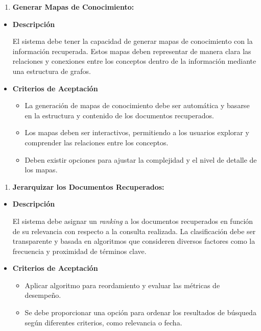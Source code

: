 \documentclass[
  12pt,
  openany]{book}
\providecommand{\tightlist}{%
  \setlength{\itemsep}{0pt}\setlength{\parskip}{0pt}}
\begin{document}
\begin{enumerate}
\def\labelenumi{\arabic{enumi}.}
\setcounter{enumi}{3}
\tightlist
\item
  \textbf{Generar Mapas de Conocimiento:}
\end{enumerate}

\begin{itemize}
\item
  \textbf{Descripción}

  El sistema debe tener la capacidad de generar mapas de conocimiento con la información recuperada. Estos mapas deben representar de manera clara las relaciones y conexiones entre los conceptos dentro de la información mediante una estructura de grafos.
\item
  \textbf{Criterios de Aceptación}

  \begin{itemize}
  \item
    La generación de mapas de conocimiento debe ser automática y basarse en la estructura y contenido de los documentos recuperados.
  \item
    Los mapas deben ser interactivos, permitiendo a los usuarios explorar y comprender las relaciones entre los conceptos.
  \item
    Deben existir opciones para ajustar la complejidad y el nivel de detalle de los mapas.
  \end{itemize}
\end{itemize}

\begin{enumerate}
\def\labelenumi{\arabic{enumi}.}
\setcounter{enumi}{4}
\tightlist
\item
  \textbf{Jerarquizar los Documentos Recuperados:}
\end{enumerate}

\begin{itemize}
\item
  \textbf{Descripción}

  El sistema debe asignar un \emph{ranking} a los documentos recuperados en función de su relevancia con respecto a la consulta realizada. La clasificación debe ser transparente y basada en algoritmos que consideren diversos factores como la frecuencia y proximidad de términos clave.
\item
  \textbf{Criterios de Aceptación}

  \begin{itemize}
  \item
    Aplicar algoritmo para reordamiento y evaluar las métricas de desempeño.
  \item
    Se debe proporcionar una opción para ordenar los resultados de búsqueda según diferentes criterios, como relevancia o fecha.
  \end{itemize}
\end{itemize}
\end{document}

